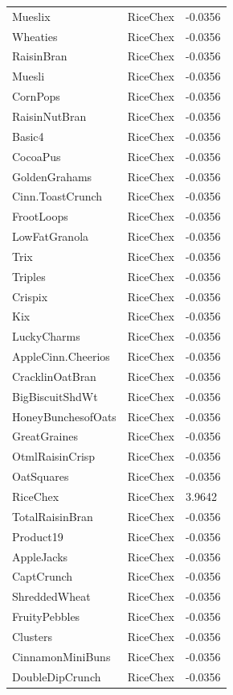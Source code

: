 \begin{table}[!htbp]
\begin{tabular}{lll}
\\
Mueslix & RiceChex & -0.0356
\\
Wheaties & RiceChex & -0.0356
\\
RaisinBran & RiceChex & -0.0356
\\
Muesli & RiceChex & -0.0356
\\
CornPops & RiceChex & -0.0356
\\
RaisinNutBran & RiceChex & -0.0356
\\
Basic4 & RiceChex & -0.0356
\\
CocoaPus & RiceChex & -0.0356
\\
GoldenGrahams & RiceChex & -0.0356
\\
Cinn.ToastCrunch & RiceChex & -0.0356
\\
FrootLoops & RiceChex & -0.0356
\\
LowFatGranola & RiceChex & -0.0356
\\
Trix & RiceChex & -0.0356
\\
Triples & RiceChex & -0.0356
\\
Crispix & RiceChex & -0.0356
\\
Kix & RiceChex & -0.0356
\\
LuckyCharms & RiceChex & -0.0356
\\
AppleCinn.Cheerios & RiceChex & -0.0356
\\
CracklinOatBran & RiceChex & -0.0356
\\
BigBiscuitShdWt & RiceChex & -0.0356
\\
HoneyBunchesofOats & RiceChex & -0.0356
\\
GreatGraines & RiceChex & -0.0356
\\
OtmlRaisinCrisp & RiceChex & -0.0356
\\
OatSquares & RiceChex & -0.0356
\\
RiceChex & RiceChex & 3.9642
\\
TotalRaisinBran & RiceChex & -0.0356
\\
Product19 & RiceChex & -0.0356
\\
AppleJacks & RiceChex & -0.0356
\\
CaptCrunch & RiceChex & -0.0356
\\
ShreddedWheat & RiceChex & -0.0356
\\
FruityPebbles & RiceChex & -0.0356
\\
Clusters & RiceChex & -0.0356
\\
CinnamonMiniBuns & RiceChex & -0.0356
\\
DoubleDipCrunch & RiceChex & -0.0356
\\

\end{tabular}
\end{table}
